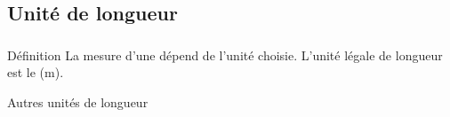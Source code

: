 \documentclass[xcolor=table]{beamer}
\begin{document}
\subsection{Unité de longueur}
\begin{frame}
	\frametitle{}  
	\framesubtitle{}	
	
	\begin{exampleblock}{Définition}
		La mesure d'une  dépend de l'unité choisie.
		L'unité légale de longueur est le  (m).		
	\end{exampleblock}
	
	\begin{alertblock}{Autres unités de longueur}
		\tiny{}
	\end{alertblock}
		
\end{frame}
\end{document}
